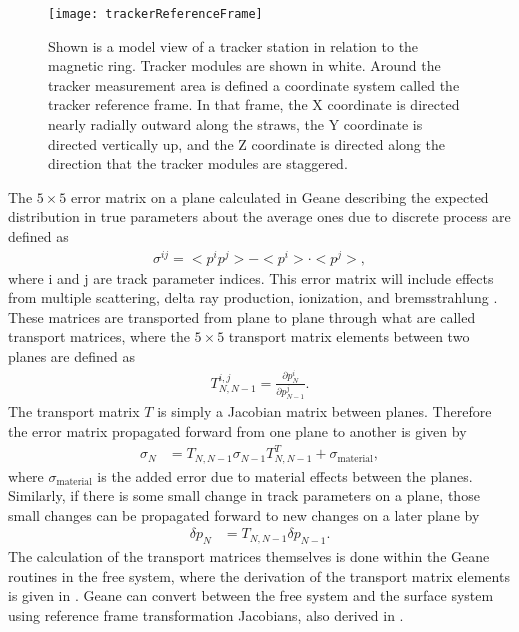 \begin{figure}[]
  \centering
  \texttt{[image: trackerReferenceFrame]}
    \caption[Tracker reference frame]{Shown is a model view of a tracker station in relation to the magnetic ring. Tracker modules are shown in white. Around the tracker measurement area is defined a coordinate system called the tracker reference frame. In that frame, the X coordinate is directed nearly radially outward along the straws, the Y coordinate is directed vertically up, and the Z coordinate is directed along the direction that the tracker modules are staggered.}
    \label{fig:trackerReferenceFrame}
\end{figure}


The $5 \times 5$ error matrix on a plane calculated in Geane describing the expected distribution in true parameters about the average ones due to discrete process are defined as
    \begin{align} \label{eq:sigma}
        \sigma^{ij} = <p^{i}p^{j}> - <p^{i}> \cdot <p^{j}>,
    \end{align} 
where i and j are track parameter indices. This error matrix will include effects from multiple scattering, delta ray production, ionization, and bremsstrahlung \cite{geanemanual,energyloss}. These matrices are transported from plane to plane through what are called transport matrices, where the $5 \times 5$ transport matrix elements between two planes are defined as 
    \begin{align}
        T_{N,N-1}^{i,j} = \frac{\partial p^{i}_{N}}{\partial p^{j}_{N-1}}. 
    \end{align}
The transport matrix $T$ is simply a Jacobian matrix between planes. Therefore the error matrix propagated forward from one plane to another is given by
    \begin{align} \label{eq:transport}
        \sigma_{N} &= T_{N,N-1} \sigma_{N-1} T_{N,N-1}^{T} + \sigma_{\text{material}},
    \end{align}
where $\sigma_{\text{material}}$ is the added error due to material effects between the planes. Similarly, if there is some small change in track parameters on a plane, those small changes can be propagated forward to new changes on a later plane by 
    \begin{align} \label{eq:transport}
        \delta p_{N} &= T_{N,N-1} \delta p_{N-1}.
    \end{align}
The calculation of the transport matrices themselves is done within the Geane routines in the free system, where the derivation of the transport matrix elements is given in . Geane can convert between the free system and the surface system using reference frame transformation Jacobians, also derived in .



